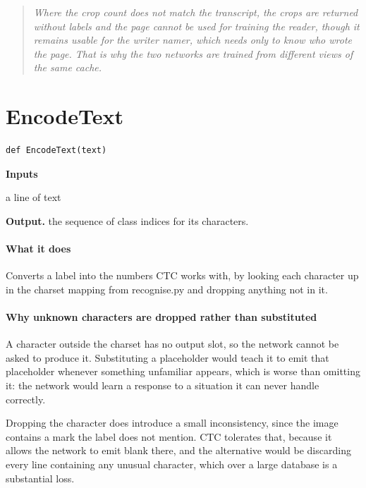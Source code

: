 \begin{quote}\small\itshape Where the crop count does not match the transcript, the crops are returned without labels and the page cannot be used for training the reader, though it remains usable for the writer namer, which needs only to know who wrote the page. That is why the two networks are trained from different views of the same cache.\end{quote}

\section{EncodeText}
\begin{lstlisting}[style=sig]
def EncodeText(text)
\end{lstlisting}

\noindent\textbf{Inputs}
\begin{description}[leftmargin=2.2em,style=nextline,font=\normalfont\ttfamily]\setlength\itemsep{1pt}
  \item[{text}] \normalfont a line of text
\end{description}

\noindent\textbf{Output.} the sequence of class indices for its characters.


\paragraph{What it does}
Converts a label into the numbers CTC works with, by looking each character up in the charset mapping from recognise.py and dropping anything not in it.


\paragraph{Why unknown characters are dropped rather than substituted}
A character outside the charset has no output slot, so the network cannot be asked to produce it. Substituting a placeholder would teach it to emit that placeholder whenever something unfamiliar appears, which is worse than omitting it: the network would learn a response to a situation it can never handle correctly.

Dropping the character does introduce a small inconsistency, since the image contains a mark the label does not mention. CTC tolerates that, because it allows the network to emit blank there, and the alternative would be discarding every line containing any unusual character, which over a large database is a substantial loss.


